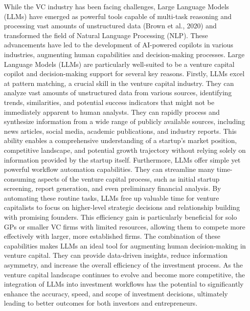 \documentclass[a4paper, oneside]{discothesis}
\begin{document}
While the VC industry has been facing challenges, Large Language Models (LLMs) have emerged as powerful tools capable of multi-task reasoning and processing vast amounts of
unstructured data (Brown et al., 2020) and transformed the field of Natural Language Processing (NLP). These advancements have led to the development of
AI-powered copilots in various industries, augmenting human capabilities and decision-making processes.
 Large Language Models (LLMs) are particularly well-suited to be a venture capital copilot and decision-making support for several key reasons. 
Firstly, LLMs excel at pattern matching, a crucial skill in the venture capital industry. They can analyze vast amounts of unstructured data from various sources, 
identifying trends, similarities, and potential success indicators that might not be immediately apparent to human analysts.
They can rapidly process and synthesize information from a wide range of publicly available sources, including news articles, social media, academic publications, 
and industry reports. This ability enables a comprehensive understanding of a startup's market position, competitive landscape, and potential growth trajectory 
without relying solely on information provided by the startup itself.
Furthermore, LLMs offer simple yet powerful workflow automation capabilities. They can streamline many time-consuming aspects of the venture capital process, 
such as initial startup screening, report generation, and even preliminary financial analysis. By automating these routine tasks, LLMs free up valuable time 
for venture capitalists to focus on higher-level strategic decisions and relationship building with promising founders. This efficiency gain is particularly 
beneficial for solo GPs or smaller VC firms with limited resources, allowing them to compete more effectively with larger, more established firms.
The combination of these capabilities makes LLMs an ideal tool for augmenting human decision-making in venture capital. They can provide data-driven insights,
 reduce information asymmetry, and increase the overall efficiency of the investment process. As the venture capital landscape continues to evolve and 
 become more competitive, the integration of LLMs into investment workflows has the potential to significantly enhance the accuracy, speed, and scope of investment decisions, ultimately leading to better outcomes for both investors and entrepreneurs.
\end{document}
